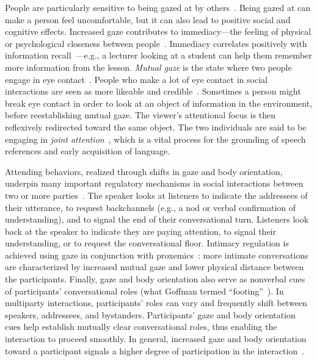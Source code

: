 People are particularly sensitive to being gazed at by others~\citep{argyle1976gaze}. Being gazed at can make a person feel uncomfortable, but it can also lead to positive social and cognitive effects. Increased gaze contributes to immediacy---the feeling of physical or psychological closeness between people~\citep{mehrabian1966immediacy}. Immediacy correlates positively with information recall~\citep{otteson1980effect,sherwood1987facilitative,fullwood2006effect,kelley1988effects}---e.g., a lecturer looking at a student can help them remember more information from the lesson.
\emph{Mutual gaze} is the state where two people engage in eye contact~\citep{argyle1976gaze}. People who make a lot of eye contact in social interactions are seen as more likeable and credible~\citep{beebe1976effects,argyle1976gaze}. Sometimes a person might break eye contact in order to look at an object of information in the environment, before reestablishing mutual gaze. The viewer's attentional focus is then reflexively redirected toward the same object. The two individuals are said to be engaging in \emph{joint attention}~\citep{moore2014joint}, which is a vital process for the grounding of speech references and early acquisition of language.

Attending behaviors, realized through shifts in gaze and body orientation, underpin many important regulatory mechanisms in social interactions between two or more parties~\citep{kendon1967some,heylen2006head}. The speaker looks at listeners to indicate the addressees of their utterance, to request backchannels (e.g., a nod or verbal confirmation of understanding), and to signal the end of their conversational turn. Listeners look back at the speaker to indicate they are paying attention, to signal their understanding, or to request the conversational floor. Intimacy regulation is achieved using gaze in conjunction with proxemics~\citep{argyle1965eyecontact}: more intimate conversations are characterized by increased mutual gaze and lower physical distance between the participants. Finally, gaze and body orientation also serve as nonverbal cues of participants' conversational roles (what Goffman termed ``footing''~\citep{goffman1979footing}). In multiparty interactions, participants' roles can vary and frequently shift between speakers, addressees, and bystanders. Participants' gaze and body orientation cues help establish mutually clear conversational roles, thus enabling the interaction to proceed smoothly. In general, increased gaze and body orientation toward a participant signals a higher degree of participation in the interaction~\citep{mutlu2012conversational}.

